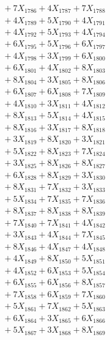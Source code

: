 \documentclass[a4paper,10pt]{article}
\begin{document}
{\begin{align}
&\;  + 7 X_{1786} + 4 X_{1787} + 7 X_{1788} \\[0.3ex]
&\;  + 4 X_{1789} + 5 X_{1790} + 4 X_{1791} \\[0.3ex]
&\;  + 4 X_{1792} + 5 X_{1793} + 4 X_{1794} \\[0.3ex]
&\;  + 6 X_{1795} + 5 X_{1796} + 6 X_{1797} \\[0.3ex]
&\;  + 4 X_{1798} + 3 X_{1799} + 6 X_{1800} \\[0.3ex]
&\;  + 6 X_{1801} + 4 X_{1802} + 8 X_{1803} \\[0.3ex]
&\;  + 8 X_{1804} + 3 X_{1805} + 8 X_{1806} \\[0.3ex]
&\;  + 6 X_{1807} + 6 X_{1808} + 7 X_{1809} \\[0.5ex]\allowbreak
&\;  + 4 X_{1810} + 3 X_{1811} + 4 X_{1812} \\[0.3ex]
&\;  + 8 X_{1813} + 5 X_{1814} + 4 X_{1815} \\[0.3ex]
&\;  + 8 X_{1816} + 3 X_{1817} + 8 X_{1818} \\[0.3ex]
&\;  + 3 X_{1819} + 8 X_{1820} + 3 X_{1821} \\[0.3ex]
&\;  + 5 X_{1822} + 8 X_{1823} + 7 X_{1824} \\[0.3ex]
&\;  + 3 X_{1825} + 8 X_{1826} + 8 X_{1827} \\[0.3ex]
&\;  + 6 X_{1828} + 8 X_{1829} + 3 X_{1830} \\[0.3ex]
&\;  + 8 X_{1831} + 7 X_{1832} + 3 X_{1833} \\[0.3ex]
&\;  + 5 X_{1834} + 7 X_{1835} + 7 X_{1836} \\[0.3ex]
&\;  + 8 X_{1837} + 8 X_{1838} + 8 X_{1839} \\[0.5ex]\allowbreak
&\;  + 7 X_{1840} + 7 X_{1841} + 4 X_{1842} \\[0.3ex]
&\;  + 3 X_{1843} + 4 X_{1844} + 7 X_{1845} \\[0.3ex]
&\;  + 8 X_{1846} + 4 X_{1847} + 4 X_{1848} \\[0.3ex]
&\;  + 4 X_{1849} + 8 X_{1850} + 5 X_{1851} \\[0.3ex]
&\;  + 4 X_{1852} + 6 X_{1853} + 5 X_{1854} \\[0.3ex]
&\;  + 6 X_{1855} + 6 X_{1856} + 8 X_{1857} \\[0.3ex]
&\;  + 7 X_{1858} + 6 X_{1859} + 7 X_{1860} \\[0.3ex]
&\;  + 5 X_{1861} + 7 X_{1862} + 5 X_{1863} \\[0.3ex]
&\;  + 6 X_{1864} + 3 X_{1865} + 6 X_{1866} \\[0.3ex]
&\;  + 5 X_{1867} + 3 X_{1868} + 8 X_{1869} \\[0.5ex]\allowbreak

\end{align}}
\end{document}
